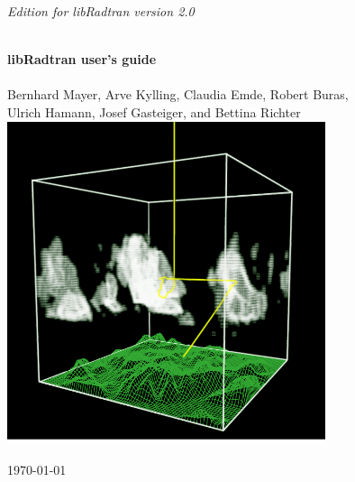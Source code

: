 \begin{titlepage}
 
\begin{center}
 
  \begin{flushright}
    {\sl \large Edition for libRadtran version 2.0}
  \end{flushright}
  \vspace*{2cm}
  
  \HRule \\[0.8cm]
  { \huge \bfseries libRadtran user's guide}\\[0.4cm]
  \HRule \\[1.5cm]
  
  \Large{Bernhard Mayer, Arve Kylling, Claudia Emde, Robert Buras, \\
    Ulrich Hamann, Josef Gasteiger, and Bettina Richter} \\[2cm]
  
  \includegraphics[width=0.7\textwidth]{figs/mystic2.png}\\

  \vfill
  
  {\large \today}
  
\end{center}

\end{titlepage}
